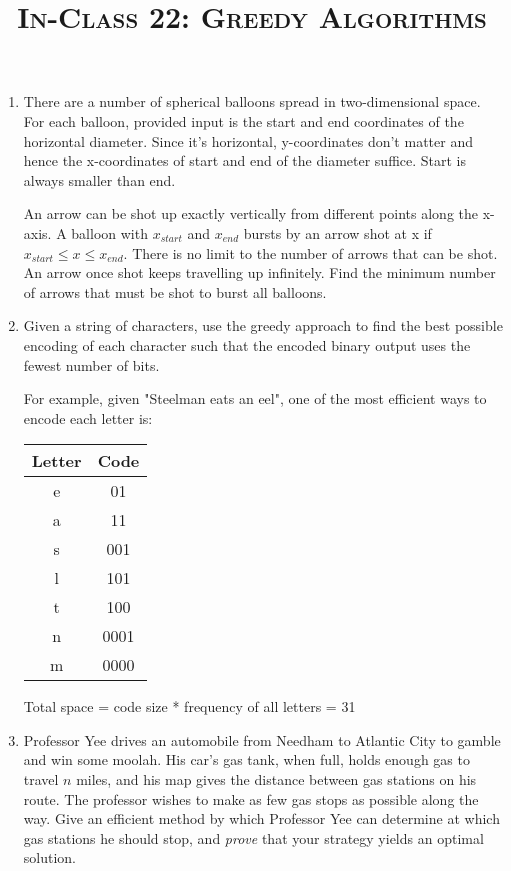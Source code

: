 \documentclass{article}
\title{\large{\textsc{In-Class 22: Greedy Algorithms}}}
\date{}
\begin{document}
\maketitle


\begin{enumerate}

\item There are a number of spherical balloons spread in two-dimensional space. For each balloon, provided input is the start and end coordinates of the horizontal diameter. Since it's horizontal, y-coordinates don't matter and hence the x-coordinates of start and end of the diameter suffice. Start is always smaller than end.

An arrow can be shot up exactly vertically from different points along the x-axis. A balloon with $x_{start}$ and $x_{end}$ bursts by an arrow shot at x if $x_{start} \leq x \leq x_{end}$. There is no limit to the number of arrows that can be shot. An arrow once shot keeps travelling up infinitely. Find the minimum number of arrows that must be shot to burst all balloons.

\item Given a string of characters, use the greedy approach to find the best possible encoding of each character such that the encoded binary output uses the fewest number of bits.

For example, given "Steelman eats an eel", one of the most efficient ways to encode each letter is:
\begin{center}
 \begin{tabular}{||c c||}
 \hline
 Letter & Code  \\ [0.5ex]
 \hline\hline
 e & 01  \\
 \hline
 a & 11  \\
 \hline
 s & 001 \\
 \hline
 l & 101 \\
  \hline
 t & 100 \\
  \hline
 n & 0001 \\
 \hline
 m & 0000\\ [1ex]
 \hline

\end{tabular}
\end{center}
 Total space = code size * frequency of all letters = 31

\item Professor Yee drives an automobile from Needham to Atlantic City to gamble and win some moolah. His car's gas tank, when full, holds enough gas to travel $n$ miles, and his map gives the distance between gas stations on his route. The professor wishes to make as few gas stops as possible along the way. Give an efficient method by which Professor Yee can determine at which gas stations he should stop, and \textit{prove} that your strategy yields an optimal solution.


\end{enumerate}
\end{document}
